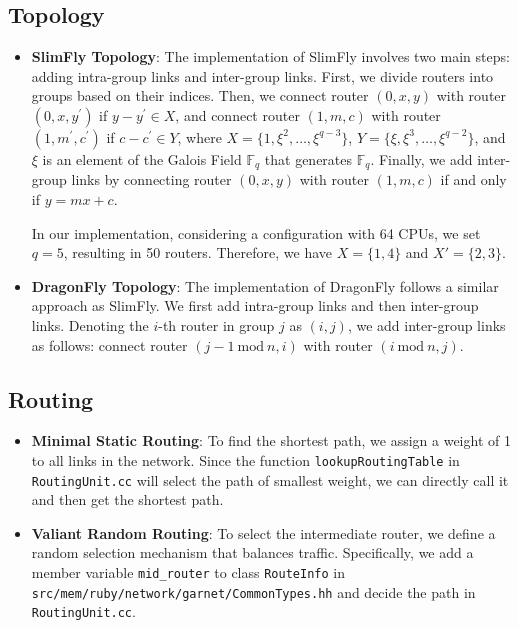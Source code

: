 \documentclass[utf8]{article}
\begin{document}
\subsection{Topology}
\begin{itemize}
    \item \textbf{SlimFly Topology}: The implementation of SlimFly involves two main steps: adding intra-group links and inter-group links. First, we divide routers into groups based on their indices. Then, we connect router \((0,x,y)\) with router \((0,x,y^\prime)\) if \(y-y^\prime \in X\), and connect router \((1,m,c)\) with router \((1,m^\prime,c^\prime)\) if \(c-c^\prime \in Y\), where \(X=\{1,\xi^2, \dots, \xi^{q-3}\}\), \(Y=\{\xi, \xi^3, \dots, \xi^{q-2}\}\), and \(\xi\) is an element of the Galois Field \(\mathbb{F}_q\) that generates \(\mathbb{F}_q\). Finally, we add inter-group links by connecting router \((0,x,y)\) with router \((1,m,c)\) if and only if \(y=mx+c\).

    In our implementation, considering a configuration with 64 CPUs, we set \(q=5\), resulting in 50 routers. Therefore, we have \(X = \{1, 4\}\) and \(X'=\{2, 3\}\).

    \item \textbf{DragonFly Topology}: The implementation of DragonFly follows a similar approach as SlimFly. We first add intra-group links and then inter-group links. Denoting the \(i\)-th router in group \(j\) as \((i,j)\), we add inter-group links as follows: connect router \((j-1 \mathrm{~mod~} n, i)\) with router \((i \mathrm{~mod~} n, j)\).
\end{itemize}

\subsection{Routing}
\begin{itemize}
    \item \textbf{Minimal Static Routing}: To find the shortest path, we assign a weight of 1 to all links in the network. Since the function \texttt{lookupRoutingTable} in \texttt{RoutingUnit.cc} will select the path of smallest weight, we can directly call it and then get the shortest path.
    \item \textbf{Valiant Random Routing}: To select the intermediate router, we define a random selection mechanism that balances traffic. Specifically, we add a member variable \texttt{mid\_router} to class \texttt{RouteInfo} in \texttt{src/mem/ruby/network/garnet/CommonTypes.hh} and decide the path in \texttt{RoutingUnit.cc}.
\end{itemize}
\end{document}

